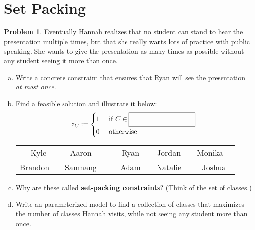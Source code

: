 \documentclass[11pt]{article}
\theoremstyle{definition}
\newtheorem{problem}{Problem}
\newcommand{\answerbox}[3]{%
  \fbox{%
    \begin{minipage}[#1]{#2}
      \hfill\vspace{#3}
    \end{minipage}
  }
}
\newcommand{\wordbox}{\answerbox{c}{1.2in}{.5cm}}
\begin{document}
\section{Set Packing}
\begin{problem}
Eventually Hannah realizes that no student can stand to hear the presentation multiple times, but that she really wants lots of practice with public speaking.  She wants to give the presentation as many times as possible without any student seeing it more than once.
\begin{enumerate}[a.]
\item Write a concrete constraint that ensures that Ryan will see the presentation \emph{at most once}.

\vfill
\item Find a feasible solution and illustrate it below:
\[
z_{C} :=
\begin{cases}
1 & \text{ if } C \in \wordbox \\
0 & \text{ otherwise } 
\end{cases}
\]

\begin{tcolorbox}
\begin{center}
\def\arraystretch{1.5}
\setlength{\tabcolsep}{12pt}
\begin{tabular}{ccccc}
Kyle & Aaron~~ & Ryan & Jordan~~ & Monika~~ \\ Brandon~~ & Samnang~~ & ~~Adam~~ & Natalie~~ & Joshua 
\end{tabular}
\end{center}
\end{tcolorbox}
\bigskip
\item Why are these called {\bf set-packing constraints}?  (Think of the set of classes.)
\vfill
\item  Write an parameterized model to find a collection of classes that maximizes the number of classes Hannah visits, while not seeing any student more than once. 
\vfill
\vfill
\end{enumerate}
\end{problem}

\newpage
\end{document}
